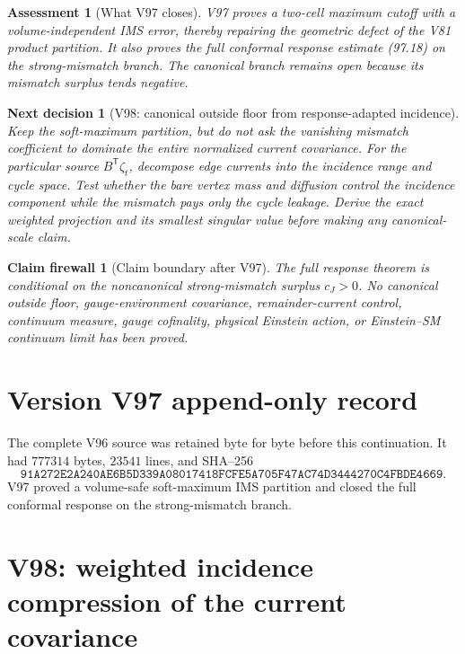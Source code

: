 \documentclass[11pt]{article}
\newtheorem{firewall}[theorem]{Claim firewall}
\newtheorem{decision}[theorem]{Next decision}
\newtheorem{assessment}[theorem]{Assessment}
\theoremstyle{remark}
\begin{document}
\begin{assessment}[What V97 closes]
\label{ass:v17v97-status}
V97 proves a two-cell maximum cutoff with a volume-independent IMS
error, thereby repairing the geometric defect of the V81 product
partition.  It also proves the full conformal response estimate
(97.18) on the strong-mismatch branch.  The canonical branch remains
open because its mismatch surplus tends negative.
\end{assessment}

\begin{decision}[V98: canonical outside floor from response-adapted incidence]
\label{dec:v17v97-next}
Keep the soft-maximum partition, but do not ask the vanishing mismatch
coefficient to dominate the entire normalized current covariance.
For the particular source \(B^{\mathsf T}\zeta_t\), decompose edge
currents into the incidence range and cycle space.  Test whether the
bare vertex mass and diffusion control the incidence component while
the mismatch pays only the cycle leakage.  Derive the exact weighted
projection and its smallest singular value before making any
canonical-scale claim.
\end{decision}

\begin{firewall}[Claim boundary after V97]
\label{fire:v17v97}
The full response theorem is conditional on the noncanonical
strong-mismatch surplus \(c_J>0\).  No canonical outside floor,
gauge-environment covariance, remainder-current control, continuum
measure, gauge cofinality, physical Einstein action, or Einstein--SM
continuum limit has been proved.
\end{firewall}

\section*{Version V97 append-only record}
The complete V96 source was retained byte for byte before this
continuation.  It had \(777314\) bytes, \(23541\) lines, and SHA--256
\[
 \texttt{91A272E2A240AE6B5D339A08017418FCFE5A705F47AC74D3444270C4FBDE4669}.
\]
V97 proved a volume-safe soft-maximum IMS partition and closed the full
conformal response on the strong-mismatch branch.


\section{V98: weighted incidence compression of the current covariance}
\label{sec:v17v98}
\end{document}
